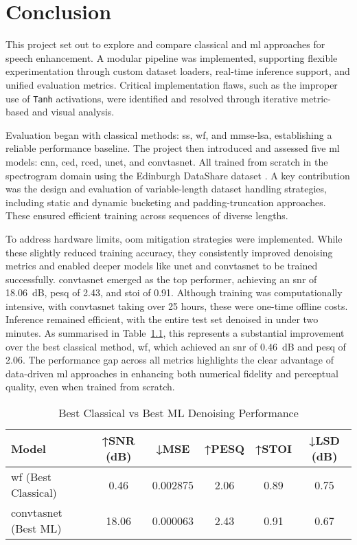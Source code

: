 \chapter{Conclusion}
\label{chp:conclusion}

This project set out to explore and compare classical and \gls{ml} approaches for speech enhancement. A modular pipeline was implemented, supporting flexible experimentation through custom dataset loaders, real-time inference support, and unified evaluation metrics. Critical implementation flaws, such as the improper use of \texttt{Tanh} activations, were identified and resolved through iterative metric-based and visual analysis.

Evaluation began with classical methods: \gls{ss}, \gls{wf}, and \gls{mmse-lsa}, establishing a reliable performance baseline. The project then introduced and assessed five \gls{ml} models: \gls{cnn}, \gls{ced}, \gls{rced}, \gls{unet}, and \gls{convtasnet}. All trained from scratch in the spectrogram domain using the Edinburgh DataShare dataset \cite{edinburghdataset}. A key contribution was the design and evaluation of variable-length dataset handling strategies, including static and dynamic bucketing and padding-truncation approaches. These ensured efficient training across sequences of diverse lengths.

To address hardware limits, \gls{oom} mitigation strategies were implemented. While these slightly reduced training accuracy, they consistently improved denoising metrics and enabled deeper models like \gls{unet} and \gls{convtasnet} to be trained successfully. \gls{convtasnet} emerged as the top performer, achieving an \gls{snr} of 18.06~dB, \gls{pesq} of 2.43, and \gls{stoi} of 0.91. Although training was computationally intensive, with \gls{convtasnet} taking over 25 hours, these were one-time offline costs. Inference remained efficient, with the entire test set denoised in under two minutes. As summarised in Table~\ref{tab:summary_comparison}, this represents a substantial improvement over the best classical method, \gls{wf}, which achieved an \gls{snr} of 0.46~dB and \gls{pesq} of 2.06. The performance gap across all metrics highlights the clear advantage of data-driven \gls{ml} approaches in enhancing both numerical fidelity and perceptual quality, even when trained from scratch.

\vspace{1em}
\begin{table}[H]
\centering
\caption{Best Classical vs Best ML Denoising Performance}
\label{tab:summary_comparison}
\begin{tabular}{|l|c|c|c|c|c|}
\hline
\textbf{Model} & \textbf{↑SNR (dB)} & \textbf{↓MSE} & \textbf{↑PESQ} & \textbf{↑STOI} & \textbf{↓LSD (dB)} \\
\hline
\gls{wf} (Best Classical) & 0.46 & 0.002875 & 2.06 & 0.89 & 0.75 \\
\gls{convtasnet} (Best ML) & 18.06 & 0.000063 & 2.43 & 0.91 & 0.67 \\
\hline
\end{tabular}
\end{table}
\vspace{1em}

